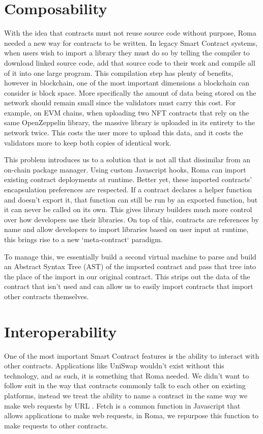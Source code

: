 \documentclass[a4paper]{article}
\begin{document}
\section{Composability}\label{sec:composability}
With the idea that contracts must not reuse source code without purpose, Roma needed a new way for contracts to be written.
In legacy Smart Contract systems, when users wish to import a library they must do so by telling the compiler to download linked source code, add that source code to their work and compile all of it into one large program.
This compilation step has plenty of benefits, however in blockchain, one of the most important dimensions a blockchain can consider is block space.
More specifically the amount of data being stored on the network should remain small since the validators must carry this cost.
For example, on EVM chains, when uploading two NFT contracts that rely on the same OpenZeppelin library, the massive library is uploaded in its entirety to the network twice.
This costs the user more to upload this data, and it costs the validators more to keep both copies of identical work.

This problem introduces us to a solution that is not all that dissimilar from an on-chain package manager.
Using custom Javascript hooks, Roma can import existing contract deployments at runtime.
Better yet, these imported contracts' encapsulation preferences are respected.
If a contract declares a helper function and doesn't export it, that function can still be run by an exported function, but it can never be called on its own.
This gives library builders much more control over how developers use their libraries.
On top of this, contracts are references by name and allow developers to import libraries based on user input at runtime, this brings rise to a new `meta-contract` paradigm.

To manage this, we essentially build a second virtual machine to parse and build an Abstract Syntax Tree (AST)\cite{ast} of the imported contract and pass that tree into the place of the import in our original contract.
This strips out the data of the contract that isn't used and can allow us to easily import contracts that import other contracts themselves.

\section{Interoperability}\label{sec:interoperability}
One of the most important Smart Contract features is the ability to interact with other contracts.
Applications like UniSwap wouldn't exist without this technology, and as such, it is something that Roma needed.
We didn't want to follow suit in the way that contracts commonly talk to each other on existing platforms, instead we treat the ability to name a contract in the same way we make web requests by URL .
Fetch is a common function in Javascript that allows applications to make web requests, in Roma, we repurpose this function to make requests to other contracts.\cite{fetch}
\end{document}
